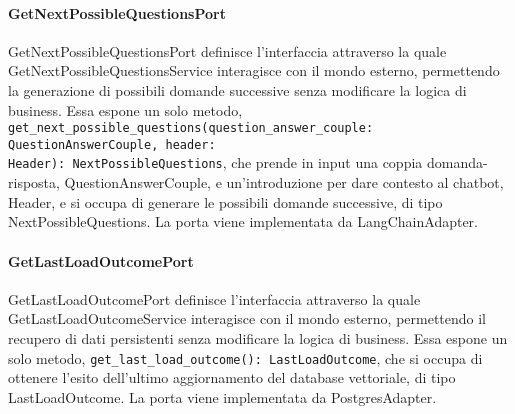 \paragraph{GetNextPossibleQuestionsPort}
\label{sec:get_next_possible_questions_port}
GetNextPossibleQuestionsPort definisce l'interfaccia attraverso la quale GetNextPossibleQuestionsService interagisce con il mondo esterno, permettendo la generazione di possibili domande successive senza modificare la logica di business. Essa espone un solo metodo, \texttt{get\_next\_possible\_questions(question\_answer\_couple: QuestionAnswerCouple, header:\\ Header): NextPossibleQuestions}, che prende in input una coppia domanda-risposta, QuestionAnswerCouple, e un'introduzione per dare contesto al chatbot, Header, e si occupa di generare le possibili domande successive, di tipo NextPossibleQuestions. La porta viene implementata da LangChainAdapter.

\paragraph{GetLastLoadOutcomePort}
\label{sec:get_last_load_outcome_port}
GetLastLoadOutcomePort definisce l'interfaccia attraverso la quale GetLastLoadOutcomeService interagisce con il mondo esterno, permettendo il recupero di dati persistenti senza modificare la logica di business. Essa espone un solo metodo, \texttt{get\_last\_load\_outcome(): LastLoadOutcome}, che si occupa di ottenere l'esito dell'ultimo aggiornamento del database vettoriale, di tipo LastLoadOutcome. La porta viene implementata da PostgresAdapter.

\newpage


\label{sec:adapter}

